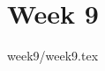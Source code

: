 \documentclass[a4paper]{book}
\begin{document}
\chapter{Week 9}

{week9/week9.tex}













\end{document}

